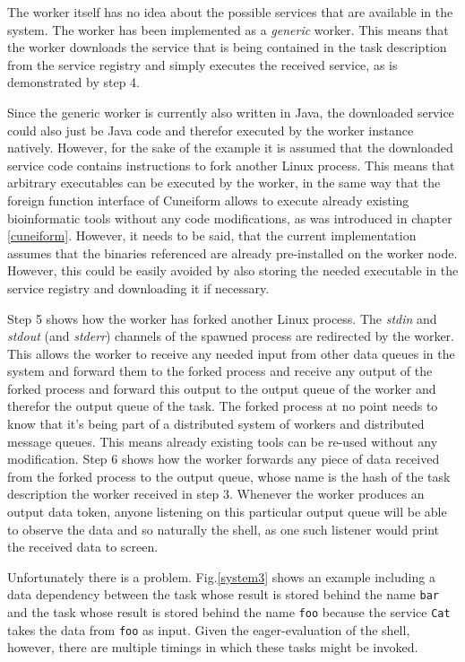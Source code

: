 The worker itself has no idea about the possible services
that are available in the system. The worker has been implemented
as a \textit{generic} worker. This means that the worker downloads
the service that is being contained in the task description from
the service registry and simply executes the received service, as
is demonstrated by step 4.

Since the generic worker is currently also written in Java,
the downloaded service could also just be Java code and therefor
executed by the worker instance natively. However, for the sake
of the example it is assumed that the downloaded service code
contains instructions to fork another Linux process. This means
that arbitrary executables can be executed by the worker, in
the same way that the foreign function interface of Cuneiform
allows to execute already existing bioinformatic tools without
any code modifications, as was introduced in chapter \ref{cuneiform}.
However, it needs to be said, that the current implementation
assumes that the binaries referenced are
already pre-installed on the worker node. However, this could be
easily avoided by also storing the needed executable in the service
registry and downloading it if necessary.
\newline

Step 5 shows how the worker has forked another Linux process.
The \textit{stdin} and \textit{stdout} (and \textit{stderr})
channels of the spawned process are redirected by the worker.
This allows the worker to receive any needed input from other
data queues in the system and forward them to the forked process
and receive any output of the forked process and forward this
output to the output queue of the worker and therefor the output
queue of the task. The forked process at no point needs to know
that it's being part of a distributed system of workers and
distributed message queues. This means already existing tools
can be re-used without any modification.
Step 6 shows how the worker forwards any piece of data
received from the forked process to the output queue, whose
name is the hash of the task description the worker received
in step 3. Whenever the worker produces an output data token,
anyone listening on this particular output queue will be able
to observe the data and so naturally the shell, as one such
listener would print the received data to screen.
\newline

Unfortunately there is a problem. Fig.\ref{system3} shows an
example including a data dependency between the task whose
result is stored behind the name \texttt{bar} and the task
whose result is stored behind the name \texttt{foo} because
the service \texttt{Cat} takes the data from \texttt{foo}
as input. Given the eager-evaluation of the shell, however,
there are multiple timings in which these
tasks might be invoked.

